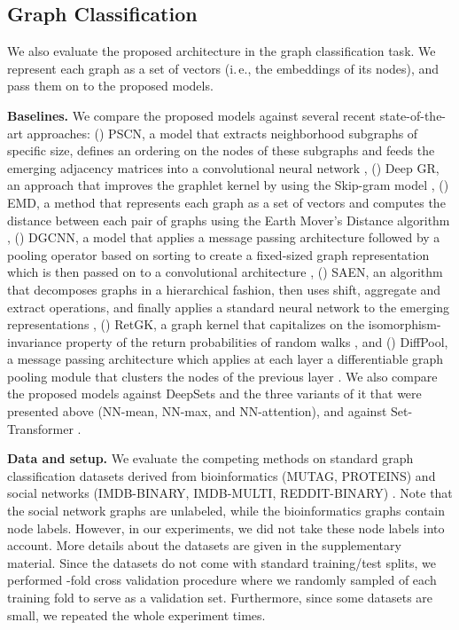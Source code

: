 \documentclass[twoside]{article}
\newcommand{\ie}{i.\,e., }
\begin{document}
\subsection{Graph Classification}
We also evaluate the proposed architecture in the graph classification task.
We represent each graph as a set of vectors (\ie the embeddings of its nodes), and pass them on to the proposed models.

\noindent\textbf{Baselines.}
We compare the proposed models against several recent state-of-the-art approaches: () PSCN, a model that extracts neighborhood subgraphs of specific size, defines an ordering on the nodes of these subgraphs and feeds the emerging adjacency matrices into a convolutional neural network \citep{niepert2016learning}, () Deep GR, an approach that improves the graphlet kernel by using the Skip-gram model \citep{yanardag2015deep}, () EMD, a method that represents each graph as a set of vectors and computes the distance between each pair of graphs using the Earth Mover's Distance algorithm \citep{nikolentzos2017matching}, () DGCNN, a model that applies a message passing architecture followed by a pooling operator based on sorting to create a fixed-sized graph representation which is then passed on to a convolutional architecture \citep{zhang2018end}, () SAEN, an algorithm that decomposes graphs in a hierarchical fashion, then uses shift, aggregate and extract operations, and finally applies a standard neural network to the emerging representations \citep{orsini2018shift}, () RetGK, a graph kernel that capitalizes on the isomorphism-invariance property of the return probabilities of random walks \citep{zhang2018retgk}, and () DiffPool, a message passing architecture which applies at each layer a differentiable graph pooling module that clusters the nodes of the previous layer \citep{ying2018hierarchical}.
We also compare the proposed models against DeepSets \citep{zaheer2017deep} and the three variants of it that were presented above (NN-mean, NN-max, and NN-attention), and against Set-Transformer \citep{lee2019set}.

\noindent\textbf{Data and setup.}
We evaluate the competing methods on standard graph classification datasets derived from bioinformatics (MUTAG, PROTEINS) and social networks (IMDB-BINARY, IMDB-MULTI, REDDIT-BINARY) \citep{KKMMN2016}.
Note that the social network graphs are unlabeled, while the bioinformatics graphs contain node labels.
However, in our experiments, we did not take these node labels into account.
More details about the datasets are given in the supplementary material.
Since the datasets do not come with standard training/test splits, we performed -fold cross validation procedure where we randomly sampled  of each training fold to serve as a validation set.
Furthermore, since some datasets are small, we repeated the whole experiment  times.
\end{document}
